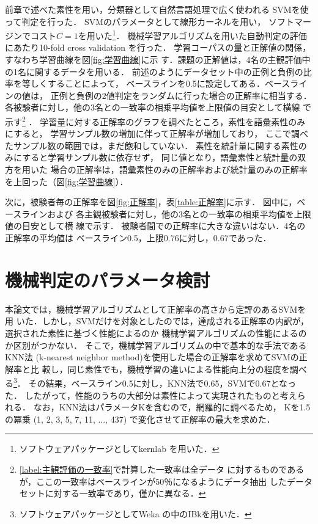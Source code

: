 \documentclass[japanese]{jnlp_1.3e}
\begin{document}
前章で述べた素性を用い，分類器として自然言語処理で広く使われる
SVMを使って判定を行った．
SVMのパラメータとして線形カーネルを用い，
ソフトマージンでコスト$C=1$を用いた\footnote{ソフトウェアパッケージとしてkernlab
\cite{kernlab}を用いた．}．
機械学習アルゴリズムを用いた自動判定の評価にあたり10-fold cross validation
を行った．
学習コーパスの量と正解値の関係，すなわち学習曲線を図\ref{fig:学習曲線}に示
す．課題の正解値は，4名の主観評価中の1名に関するデータを用いる．
前述のようにデータセット中の正例と負例の比率を等しくすることによって，
ベースラインを0.5に設定してある．ベースラインの値は，
正例と負例の2値判定をランダムに行った場合の正解率に相当する．
各被験者に対し，他の3名との一致率の相乗平均値を上限値の目安として横線
で示す\footnote{\ref{label:主観評価の一致率}で計算した一致率は全データ
に対するものであるが，ここの一致率はベースラインが50{\kern0pt}％になるようにデータ抽出
したデータセットに対する一致率であり，僅かに異なる．} ．
学習量に対する正解率のグラフを調べたところ，素性を語彙素性のみにすると，
学習サンプル数の増加に伴って正解率が増加しており，
ここで調べたサンプル数の範囲では，まだ飽和していない．
素性を統計量に関する素性のみにすると学習サンプル数に依存せず，
同じ値となり，語彙素性と統計量の双方を用いた
場合の正解率は，語彙素性のみの正解率および統計量のみの正解率を上回った（図\ref{fig:学習曲線}）．

次に，被験者毎の正解率を図\ref{fig:正解率}，表\ref{table:正解率}に示す．
図中に，ベースラインおよび
各主観被験者に対し，他の3名との一致率の相乗平均値を上限値の目安として横
線で示す．
被験者間での正解率に大きな違いはない．4名の正解率の平均値は
ベースライン0.5，上限0.76に対し，0.67であった．






\section{機械判定のパラメータ検討}

本論文では，機械学習アルゴリズムとして正解率の高さから定評のあるSVMを用
いた．しかし，SVMだけを対象としたのでは，達成される正解率の内訳が，
選択された素性に基づく性能によるのか
機械学習アルゴリズムの性能によるのか区別がつかない．
そこで，機械学習アルゴリズムの中で基本的な手法であるKNN法
(k-nearest neighbor method)を使用した場合の正解率を求めてSVMの正解率と比
較し，同じ素性でも，機械学習の違いによる性能向上分の程度を調べる\footnote{ソフトウェアパッケージとしてWeka
\cite{Weka}の中のIBkを用いた．}．
その結果，ベースライン0.5に対し，KNN法で0.65，SVMで0.67となった．
したがって，性能のうちの大部分は素性によって実現されたものと考えられる．
なお，KNN法はパラメータKを含むので，網羅的に調べるため，
Kを1.5の冪乗 (1, 2, 3, 5, 7, 11, ..., 437) で変化させて正解率の最大を求めた．
\end{document}
